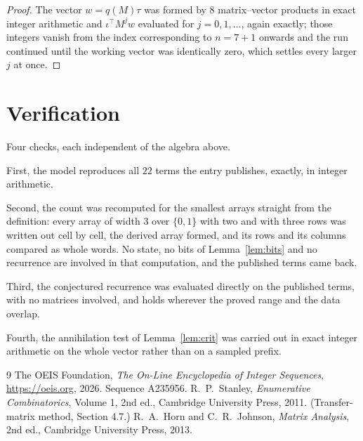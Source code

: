 \documentclass[11pt,a4paper]{article}
\theoremstyle{plain}
\theoremstyle{definition}
\begin{document}
\begin{proof}
The vector $w=q(M)\tau$ was formed by $8$ matrix--vector products in exact integer
arithmetic and $\iota^{\!\top}M^{j}w$ evaluated for $j=0,1,\dots$, again exactly; those
integers vanish from the index corresponding to $n=7+1$ onwards and the run continued
until the working vector was identically zero, which settles every larger $j$ at once.
\end{proof}

\section{Verification}

Four checks, each independent of the algebra above.

First, the model reproduces all $22$ terms the entry publishes, exactly, in integer
arithmetic.

Second, the count was recomputed for the smallest arrays straight from the definition: every
array of width $3$ over $\{0,1\}$ with two and with three rows was written out cell by cell,
the derived array formed, and its rows and its columns compared as whole words. No state, no
bits of Lemma~\ref{lem:bits} and no recurrence are involved in that computation, and the
published terms came back.

Third, the conjectured recurrence was evaluated directly on the published terms, with no
matrices involved, and holds wherever the proved range and the data overlap.

Fourth, the annihilation test of Lemma~\ref{lem:crit} was carried out in exact integer
arithmetic on the whole vector rather than on a sampled prefix.

\begin{thebibliography}{9}
 The OEIS Foundation, \emph{The On-Line Encyclopedia of Integer
Sequences}, \url{https://oeis.org}, 2026. Sequence A235956.
 R.~P.~Stanley, \emph{Enumerative Combinatorics}, Volume 1, 2nd ed.,
Cambridge University Press, 2011. (Transfer-matrix method, Section 4.7.)
 R.~A.~Horn and C.~R.~Johnson, \emph{Matrix Analysis}, 2nd ed., Cambridge
University Press, 2013.
\end{thebibliography}
\end{document}
